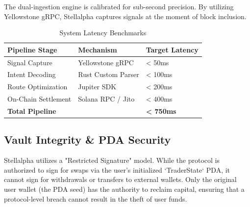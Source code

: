 The dual-ingestion engine is calibrated for sub-second precision. By utilizing Yellowstone gRPC, Stellalpha captures signals at the moment of block inclusion.

\begin{table}[H]
\centering
\small
\begin{tabular}{l l l}
\toprule
\textbf{Pipeline Stage} & \textbf{Mechanism} & \textbf{Target Latency} \\
\midrule
Signal Capture & Yellowstone gRPC & < 50ms \\
Intent Decoding & Rust Custom Parser & < 100ms \\
Route Optimization & Jupiter SDK & < 200ms \\
On-Chain Settlement & Solana RPC / Jito & < 400ms \\
\midrule
\textbf{Total Pipeline} & & \textbf{< 750ms} \\
\bottomrule
\end{tabular}
\caption{System Latency Benchmarks}
\end{table}

\subsection{Vault Integrity \& PDA Security}

Stellalpha utilizes a "Restricted Signature" model. While the protocol is authorized to sign for swaps via the user's initialized `TraderState` PDA, it cannot sign for withdrawals or transfers to external wallets. Only the original user wallet (the PDA seed) has the authority to reclaim capital, ensuring that a protocol-level breach cannot result in the theft of user funds.
